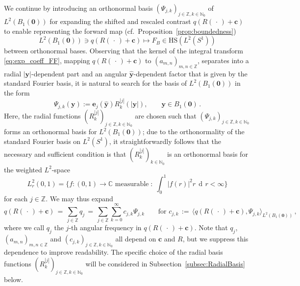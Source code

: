 \documentclass[11pt,a4paper]{article}
\theoremstyle{definition}
\theoremstyle{remark} \newtheorem{remark}[theorem]{Remark}
\numberwithin{equation}{section}
\numberwithin{figure}{section}
\numberwithin{algorithm}{section}
\numberwithin{table}{section}
\newcommand{\field}[1]{{\mathbb{#1}}}
\newcommand{\C}{\field{C}}
\newcommand{\N}{\field{N}}
\newcommand{\Z}{\field{Z}}
\newcommand{\bs}{\boldsymbol}
\newcommand{\bfc}{{\bs c}}
\newcommand{\bfe}{{\bs e}}
\newcommand{\bfy}{{\bs y}}
\newcommand{\bfzero}{{\bs 0}}
\newcommand{\yhat}{\widehat{\bfy}}
\newcommand{\HS}{\mathrm{HS}}
\newcommand{\dr}{\, \dif r}
\newcommand{\ph}{\,\cdot\,}
\newcommand{\Sone}{{S^1}}
\newcommand{\Ltwo}{{L^2}}
\DeclareMathOperator{\dif}{d\!}
\begin{document}
We continue by introducing an orthonormal basis $(\Psi_{j,k})_{j\in\Z,k\in\N_0}$ of $L^2(B_1(\bfzero))$ for expanding the shifted and rescaled contrast $q(R(\ph)+\bfc)$ to enable representing the forward map (cf.~Proposition~\ref{prop:boundedness})
\begin{equation}
\label{eq:forward}
L^2(B_1(\bfzero)) \ni q(R(\ph)+\bfc) \mapsto F_B \in \HS(\Ltwo(\Sone))
\end{equation}
between orthonormal bases. Observing that the kernel of the integral transform \eqref{eq:exp_coeff_FF}, mapping  $q(R(\ph)+\bfc)$ to $(a_{m,n})_{m,n \in \Z}$, separates into a radial $|\bfy|$-dependent part and an angular $\yhat$-dependent factor that is given by the standard Fourier basis, it is natural to search for the basis of $L^2(B_1(\bfzero))$ in the form
\begin{equation}
\label{eq:def_Psi}
    \Psi_{j,k}(\bfy):=\bfe_j(\yhat)R_k^{|j|}(|\bfy|),
    \qquad  \bfy\in B_1(\bfzero)\,.
\end{equation}
Here, the radial functions $(R_k^{|j|})_{j\in\Z,k\in\N_0}$ are chosen such that $(\Psi_{j,k})_{j\in\Z,k\in\N_0}$ forms an orthonormal basis for $\Ltwo(B_1(\bfzero))$; due to the orthonormality of the standard Fourier basis on $\Ltwo(\Sone)$, it straightforwardly follows that the necessary and sufficient condition is that $(R_k^{|j|})_{k\in\N_0}$ is an orthonormal basis for the weighted $L^2$-space
\begin{equation}
L^2_r(0,1) = \bigg\{ f: (0,1) \to \C \text{ measurable} \; : \; \int_0^1 |f(r)|^2 r \dr < \infty \bigg\} 
\end{equation}
for each $j \in \Z$. We may thus expand
\begin{equation}
\label{eq:exp_qc}
	q(R(\ph)+\bfc) \,=\, \sum_{j\in\Z} q_j \,=\, \sum_{j\in\Z}\sum_{k=0}^\infty c_{j,k} \Psi_{j,k}
	\qquad \text{for } c_{j,k}\,:=\, \big \langle q(R(\ph)+\bfc), \Psi_{j,k} \big \rangle_{\Ltwo(B_1(\bfzero))}\,,
\end{equation}
where we call $q_j$ the $j$-th angular frequency in $q(R(\ph)+\bfc)$. 
Note that $q_j$, $(a_{m,n})_{m,n\in\Z}$ and $(c_{j,k})_{j\in\Z,k\in\N_0}$ all depend on $\bfc$ and $R$, but we suppress this dependence to improve readability. The specific choice of the radial basis functions $(R_k^{|j|})_{j\in\Z,k\in\N_0}$ will be considered in Subsection~\ref{subsec:RadialBasis} below.
\end{document}
